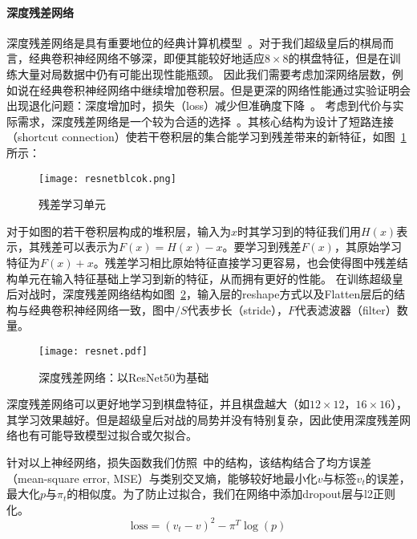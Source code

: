 \paragraph{深度残差网络}
深度残差网络是具有重要地位的经典计算机模型~\cite{resnet}。对于我们超级皇后的棋局而言，经典卷积神经网络不够深，即便其能较好地适应$8\times8$的棋盘特征，但是在训练大量对局数据中仍有可能出现性能瓶颈。
因此我们需要考虑加深网络层数，例如说在经典卷积神经网络中继续增加卷积层。但是更深的网络性能通过实验证明会出现退化问题：深度增加时，损失（loss）减少但准确度下降~\cite{resnet,he2016identity}。
考虑到代价与实际需求，深度残差网络是一个较为合适的选择~\cite{resnet}。其核心结构为设计了短路连接（shortcut connection）使若干卷积层的集合能学习到残差带来的新特征，如图~\ref{fig:resunit}所示：
\begin{figure}[htb]
    \centering
    \texttt{[image: resnetblcok.png]}
    \caption[resunit]{%
    残差学习单元~\cite{resnet}%
      }
    \label{fig:resunit}
\end{figure}
对于如图的若干卷积层构成的堆积层，输入为$x$时其学习到的特征我们用$H(x)$表示，其残差可以表示为$F(x)=H(x)-x$。要学习到残差$F(x)$，其原始学习特征为$F(x)+x$。残差学习相比原始特征直接学习更容易，也会使得图中残差结构单元在输入特征基础上学习到新的特征，从而拥有更好的性能。
在训练超级皇后对战时，深度残差网络结构如图~\ref{fig:res}，输入层的reshape方式以及Flatten层后的结构与经典卷积神经网络一致，图中$/S$代表步长（stride），$F$代表滤波器（filter）数量。
\begin{figure}[htb]
    \centering
    \texttt{[image: resnet.pdf]}
    \caption[res]{%
    深度残差网络：以ResNet50为基础~\cite{resnet}%
      }
    \label{fig:res}
\end{figure}
深度残差网络可以更好地学习到棋盘特征，并且棋盘越大（如$12\times12$，$16\times16$），其学习效果越好。但是超级皇后对战的局势并没有特别复杂，因此使用深度残差网络也有可能导致模型过拟合或欠拟合。

针对以上神经网络，损失函数我们仿照~\cite{Silver2017}中的结构，该结构结合了均方误差（mean-square error, MSE）与类别交叉熵，能够较好地最小化$v$与标签$v_{t}$的误差，最大化$p$与$\pi_{t}$的相似度。为了防止过拟合，我们在网络中添加dropout层与l2正则化。
\begin{equation}
    \text{loss} = (v_{t}-v)^{2} - \pi^{T}\log(p)
\end{equation}
